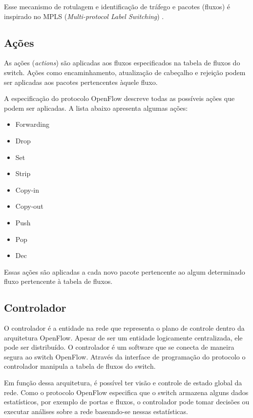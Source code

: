 Esse mecanismo de rotulagem e identificação de tráfego e pacotes (fluxos) é
inspirado no MPLS (\emph{Multi-protocol Label Switching}) 
\citep{bruce2008mpls}.

\subsection{Ações}

As ações (\emph{actions}) são aplicadas aos fluxos especificados na tabela
de fluxos do switch.
Ações como encaminhamento, atualização de cabeçalho e rejeição podem ser 
aplicadas aos pacotes pertencentes àquele fluxo.

A especificação do protocolo OpenFlow \citep{ofprotocol2015} descreve todas 
as possíveis ações que podem ser aplicadas.
A lista abaixo apresenta algumas ações:

\begin{multicols}{3}
    \begin{itemize}
        \item Forwarding
        \item Drop
        \item Set
        \item Strip
        \item Copy-in
        \item Copy-out
        \item Push
        \item Pop
        \item Dec
    \end{itemize}
\end{multicols}

Essas ações são aplicadas a cada novo pacote pertencente ao algum determinado
fluxo pertencente à tabela de fluxos.

\subsection{Controlador}

O controlador é a entidade na rede que representa o plano de controle dentro
da arquitetura OpenFlow.
Apesar de ser um entidade logicamente centralizada, ele pode ser distribuído.
O controlador é um software que se conecta de maneira segura ao switch 
OpenFlow.
Através da interface de programação do protocolo o controlador manipula 
a tabela de fluxos do switch.

Em função dessa arquitetura, é possível ter visão e controle de estado global
da rede.
Como o protocolo OpenFlow especifica que o switch armazena alguns dados 
estatísticos, por exemplo de portas e fluxos, o controlador pode tomar 
decisões ou executar análises sobre a rede baseando-se nessas estatísticas.

